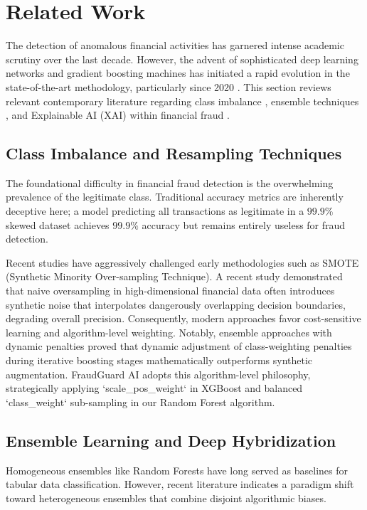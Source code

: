 \documentclass[conference]{IEEEtran}
\begin{document}
\section{Related Work}
\label{sec:related}
The detection of anomalous financial activities has garnered intense academic scrutiny over the last decade. However, the advent of sophisticated deep learning networks and gradient boosting machines has initiated a rapid evolution in the state-of-the-art methodology, particularly since 2020 \cite{karthika2022, ranjan2024}. This section reviews relevant contemporary literature regarding class imbalance \cite{dalpozzolo2015, almubark2024}, ensemble techniques \cite{ileberi2024, ranjan2024}, and Explainable AI (XAI) within financial fraud \cite{lundberg2017, hassan2023}.

\subsection{Class Imbalance and Resampling Techniques}
The foundational difficulty in financial fraud detection is the overwhelming prevalence of the legitimate class. Traditional accuracy metrics are inherently deceptive here; a model predicting all transactions as legitimate in a $99.9\%$ skewed dataset achieves $99.9\%$ accuracy but remains entirely useless for fraud detection. 

Recent studies have aggressively challenged early methodologies such as SMOTE (Synthetic Minority Over-sampling Technique). A recent study \cite{almubark2024} demonstrated that naive oversampling in high-dimensional financial data often introduces synthetic noise that interpolates dangerously overlapping decision boundaries, degrading overall precision. Consequently, modern approaches favor cost-sensitive learning and algorithm-level weighting. Notably, ensemble approaches with dynamic penalties \cite{ileberi2024} proved that dynamic adjustment of class-weighting penalties during iterative boosting stages mathematically outperforms synthetic augmentation. FraudGuard AI adopts this algorithm-level philosophy, strategically applying `scale\_pos\_weight` in XGBoost and balanced `class\_weight` sub-sampling in our Random Forest algorithm.

\subsection{Ensemble Learning and Deep Hybridization}
Homogeneous ensembles like Random Forests have long served as baselines for tabular data classification. However, recent literature indicates a paradigm shift toward heterogeneous ensembles that combine disjoint algorithmic biases. 
\end{document}
